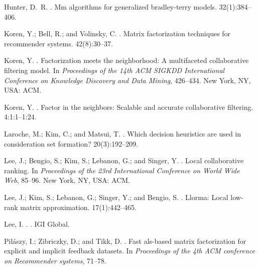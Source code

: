 \documentclass[letterpaper]{article} %
\begin{document}
\begin{thebibliography}{}
Hunter, D.~R.
.
\newblock Mm algorithms for generalized bradley-terry models.
 32(1):384--406.

Koren, Y.; Bell, R.; and Volinsky, C.
.
\newblock Matrix factorization techniques for recommender systems.
 42(8):30--37.

Koren, Y.
.
\newblock Factorization meets the neighborhood: A multifaceted collaborative
  filtering model.
\newblock In {\em Proceedings of the 14th ACM SIGKDD International Conference
  on Knowledge Discovery and Data Mining},  426--434.
\newblock New York, NY, USA: ACM.

Koren, Y.
.
\newblock Factor in the neighbors: Scalable and accurate collaborative
  filtering.
 4:1:1--1:24.

Laroche, M.; Kim, C.; and Matsui, T.
.
\newblock Which decision heuristics are used in consideration set formation?
 20(3):192--209.

Lee, J.; Bengio, S.; Kim, S.; Lebanon, G.; and Singer, Y.
.
\newblock Local collaborative ranking.
\newblock In {\em Proceedings of the 23rd International Conference on World
  Wide Web},  85--96.
\newblock New York, NY, USA: ACM.

Lee, J.; Kim, S.; Lebanon, G.; Singer, Y.; and Bengio, S.
.
\newblock Llorma: Local low-rank matrix approximation.
 17(1):442--465.

Lee, I.
.
.
\newblock IGI Global.

Pil\'{a}szy, I.; Zibriczky, D.; and Tikk, D.
.
\newblock Fast als-based matrix factorization for explicit and implicit
  feedback datasets.
\newblock In {\em Proceedings of the 4th ACM conference on Recommender
  systems},  71--78.


\end{thebibliography}
\end{document}
